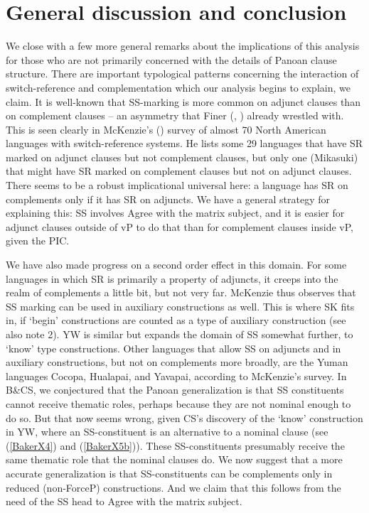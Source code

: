 \documentclass[output=paper]{langscibook}
\begin{document}
\section{General discussion and conclusion}\label{sec:baker:6}

We close with a few more general remarks about the implications of this analysis for those who are not primarily concerned with the details of Panoan clause structure. There are important typological patterns concerning the interaction of switch-ref\-er\-ence and complementation which our analysis begins to explain, we claim. It is well-known that SS-marking is more common on adjunct clauses than on complement clauses – an asymmetry that Finer (\citeyear{finer1984formal}, \citeyear{finer1985syntax}) already wrestled with. This is seen clearly in McKenzie’s (\citeyear{mckenzie2015survey}) survey of almost 70 North American languages with switch-ref\-er\-ence systems. He lists some 29 languages that have SR marked on adjunct clauses but not complement clauses, but only one (Mikasuki) that might have SR marked on complement clauses but not on adjunct clauses. There seems to be a robust implicational universal here: a language has SR on complements only if it has SR on adjuncts. We have a general strategy for explaining this: SS involves Agree with the matrix subject, and it is easier for adjunct clauses outside of vP to do that than for complement clauses inside vP, given the PIC.

We have also made progress on a second order effect in this domain. For some languages in which SR is primarily a property of adjuncts, it creeps into the realm of complements a little bit, but not very far. McKenzie thus observes that SS marking can be used in auxiliary constructions as well. This is where SK fits in, if ‘begin’ constructions are counted as a type of auxiliary construction (see also note 2). YW is similar but expands the domain of SS somewhat further, to ‘know’ type constructions. Other languages that allow SS on adjuncts and in auxiliary constructions, but not on complements more broadly, are the Yuman languages Cocopa, Hualapai, and Yavapai, according to McKenzie’s survey. In B\&CS, we conjectured that the Panoan generalization is that SS constituents cannot receive thematic roles, perhaps because they are not nominal enough to do so. But that now seems wrong, given CS’s discovery of the ‘know’ construction in YW, where an SS-constituent is an alternative to a nominal clause (see (\ref{BakerX4}) and (\ref{BakerX5b})). These SS-constituents presumably receive the same thematic role that the nominal clauses do. We now suggest that a more accurate generalization is that SS-constituents can be complements only in reduced (non-ForceP) constructions. And we claim that this follows from the need of the SS head to Agree with the matrix subject.
\end{document}
